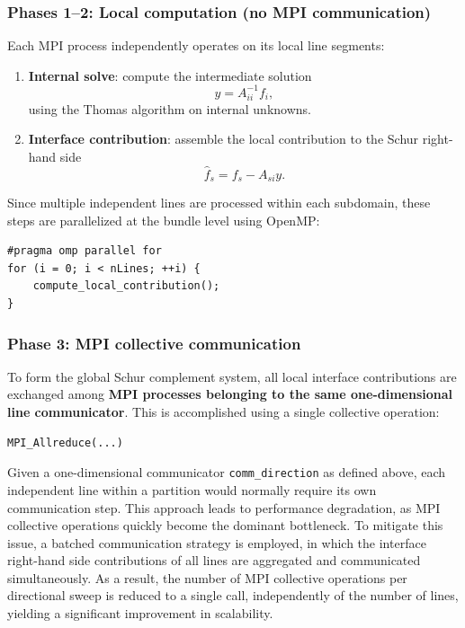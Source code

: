 \documentclass[12pt]{article}
\begin{document}
\subsubsection{Phases 1--2: Local computation (no MPI communication)}

Each MPI process independently operates on its local line segments:
\begin{enumerate}
    \item \textbf{Internal solve}: compute the intermediate solution
    \[
        y = A_{ii}^{-1} f_i,
    \]
    using the Thomas algorithm on internal unknowns.
    \item \textbf{Interface contribution}: assemble the local contribution to the Schur right-hand side
    \[
        \hat{f}_s = f_s - A_{si} y .
    \]
\end{enumerate}

Since multiple independent lines are processed within each subdomain, these steps are parallelized at the bundle level using OpenMP:
\begin{verbatim}
#pragma omp parallel for
for (i = 0; i < nLines; ++i) {
    compute_local_contribution();
}
\end{verbatim}

\subsubsection{Phase 3: MPI collective communication}

To form the global Schur complement system, all local interface contributions are exchanged among \textbf{MPI processes belonging to the same one-dimensional line communicator}. This is accomplished using a single collective operation:
\begin{verbatim}
MPI_Allreduce(...)
\end{verbatim}

Given a one-dimensional communicator \texttt{comm\_direction} as defined above, each independent line within a partition would normally require its own communication step. This approach leads to performance degradation, as MPI collective operations quickly become the dominant bottleneck. To mitigate this issue, a batched communication strategy is employed, in which the interface right-hand side contributions of all lines are aggregated and communicated simultaneously. As a result, the number of MPI collective operations per directional sweep is reduced to a single call, independently of the number of lines, yielding a significant improvement in scalability.
\end{document}
